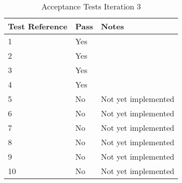 \begin{table}[h]
\centering
\small
\begin{tabular}{lll}
\hline
\textbf{Test Reference} & \textbf{Pass} & \textbf{Notes} \\ \hline
1              & Yes              &                \\ 
2              & Yes              &                \\ 
3              & Yes              &                \\ 
4              & Yes              &                \\ 
5              & No              & Not yet implemented               \\ 
6              & No              & Not yet implemented               \\ 
7              & No              & Not yet implemented               \\ 
8              & No              & Not yet implemented               \\ 
9              & No              & Not yet implemented               \\ 
10             & No              & Not yet implemented               \\ \hline
\end{tabular}
\caption{Acceptance Tests Iteration 3 \protect {\label{tab:acc_test_1}}}
\end{table}